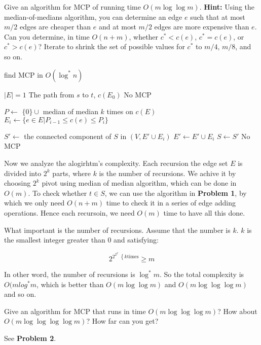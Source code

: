 \documentclass[11pt,a4paper,oneside]{article}
\begin{document}
\begin{problem}{2}
	\statement
	Give an algorithm for MCP of running time $O(m \log \log m)$. \textbf{Hint:} Using the median-of-medians algorithm,
	you can determine an edge $e$ such that at most $m/2$ edges are cheaper than $e$ and at most $m/2$ edges are
	more expensive than $e$. Can you determine, in time $O(n+m)$, whether $c^* < c(e)$, $c^* = c(e)$, or $c^* > c(e)$?
	Iterate to shrink the set of possible
	values for $c^*$ to $m/4$, $m/8$, and so on.

	\solution
	
	\begin{algorithm}
		\caption{find MCP in $O(\log^* n)$}
		\begin{algorithmic}[1]
			\If $|E| = 1$
				\If {some $x \in S$ and $t$ are connected in $(V, E \cup E')$}
					\State \Return The path from $s$ to $t$, $c(E_0)$
				\Else
					\State \Return No MCP
				\EndIf
			\EndIf
			
			\State $P \gets$ $\{0\} \cup$ median of median $k$ times on $c(E)$
			\State $E_i \gets \{e \in E | P_{i-1} \leq c(e) \leq P_i\}$

				\State $S' \gets$ the connected component of $S$ in $(V, E' \cup E_i)$
					\State {}
				\EndIf
				\State $E' \gets E' \cup E_i$
				\State $S \gets S'$
			\EndFor
			\State \Return No MCP
			\EndFunction
		\end{algorithmic}
	\end{algorithm}

	Now we analyze the alogirhtm's complexity. Each recursion the edge set \(E\) is divided into \(2^k\) parts, where \(k\) is the number of recursions. We achive it by choosing \(2^k\) pivot using median of median algorithm, which can be done in \(O(m)\). To check whether \(t \in S\), we can use the algorithm in \textbf{Problem 1}, by which we only need \(O(n+m)\) time to check it in a series of edge adding operations. Hence each recursoin, we need \(O(m)\) time to have all this done.
	
	What important is the number of recursions. Assume that the number is \(k\). \(k\) is the smallest integer greater than \(0\) and satisfying:
	
	\[2^{2^{2^{2^{\dots}}} \left\{k \text{times} \right.} \geq m\]
	
	In other word, the number of recursions is \(\log^* m\). So the total complexity is \(O(mlog^*m\), which is better than \(O(m\log\log m)\) and \(O(m\log\log\log m)\) and so on.
	
\end{problem}
\begin{problem}{3}
	\statement
	Give an algorithm for MCP that runs in time $O(m \log \log \log m)$? How about $O(m \log \log \log \log m)$? How far can you get?
	
	\solution
	
	See \textbf{Problem 2}.

\end{problem}
\end{document}
